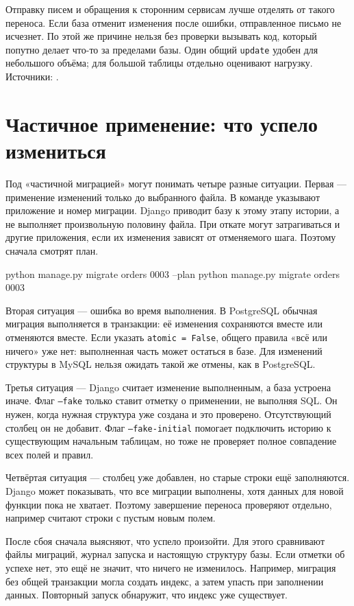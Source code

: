 \documentclass[11pt,a4paper]{article}
\newcommand{\src}[1]{{\small\color{muted}Источники: #1.}}
\newcommand{\parthead}[1]{\Needspace{10\baselineskip}\section{#1}}
\begin{document}
Отправку писем и обращения к сторонним сервисам лучше отделять от такого переноса. Если база отменит изменения после ошибки, отправленное письмо не исчезнет. По этой же причине нельзя без проверки вызывать код, который попутно делает что-то за пределами базы. Один общий \texttt{update} удобен для небольшого объёма; для большой таблицы отдельно оценивают нагрузку.
\src{\cite{operations,transactions,querysets}}

\parthead{Частичное применение: что успело измениться}

Под «частичной миграцией» могут понимать четыре разные ситуации. Первая --- применение изменений только до выбранного файла. В команде указывают приложение и номер миграции. Django приводит базу к этому этапу истории, а не выполняет произвольную половину файла. При откате могут затрагиваться и другие приложения, если их изменения зависят от отменяемого шага. Поэтому сначала смотрят план.
\begin{code}
python manage.py migrate orders 0003 --plan
python manage.py migrate orders 0003
\end{code}
Вторая ситуация --- ошибка во время выполнения. В PostgreSQL обычная миграция выполняется в транзакции: её изменения сохраняются вместе или отменяются вместе. Если указать \texttt{atomic = False}, общего правила «всё или ничего» уже нет: выполненная часть может остаться в базе. Для изменений структуры в MySQL нельзя ожидать такой же отмены, как в PostgreSQL.

Третья ситуация --- Django считает изменение выполненным, а база устроена иначе. Флаг \texttt{--fake} только ставит отметку о применении, не выполняя SQL. Он нужен, когда нужная структура уже создана и это проверено. Отсутствующий столбец он не добавит. Флаг \texttt{--fake-initial} помогает подключить историю к существующим начальным таблицам, но тоже не проверяет полное совпадение всех полей и правил.

Четвёртая ситуация --- столбец уже добавлен, но старые строки ещё заполняются. Django может показывать, что все миграции выполнены, хотя данных для новой функции пока не хватает. Поэтому завершение переноса проверяют отдельно, например считают строки с пустым новым полем.

После сбоя сначала выясняют, что успело произойти. Для этого сравнивают файлы миграций, журнал запуска и настоящую структуру базы. Если отметки об успехе нет, это ещё не значит, что ничего не изменилось. Например, миграция без общей транзакции могла создать индекс, а затем упасть при заполнении данных. Повторный запуск обнаружит, что индекс уже существует.
\end{document}
